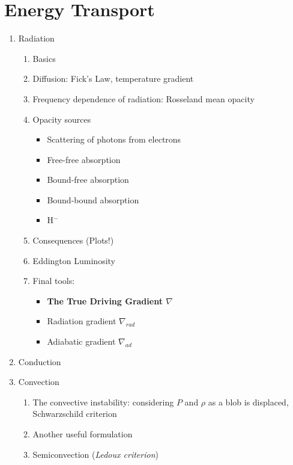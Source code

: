 \documentclass{article}
\begin{document}
\section{Energy Transport}
\begin{enumerate}
    \item Radiation
        \begin{enumerate}
            \item Basics
            \item Diffusion: Fick's Law, temperature gradient
            \item Frequency dependence of radiation:
                Rosseland mean opacity
            \item Opacity sources
                \begin{itemize}
                   \item Scattering of photons from electrons
                   \item Free-free absorption
                   \item Bound-free absorption
                   \item Bound-bound absorption
                   \item H$^-$
                \end{itemize}
            \item Consequences (Plots!)
            \item Eddington Luminosity
            \item Final tools:
                \begin{itemize}
                  \item \textbf{The True Driving Gradient $\nabla$}
                  \item Radiation gradient $\nabla_{rad}$
                  \item Adiabatic gradient $\nabla_{ad}$
                \end{itemize}
        \end{enumerate}
    \item Conduction
    \item Convection
        \begin{enumerate}
            \item The convective instability: considering $P$ and $\rho$
                as a blob is displaced, Schwarzschild criterion
            \item Another useful formulation
            \item Semiconvection (\textit{Ledoux criterion})

\end{enumerate}
\end{enumerate}
\end{document}
